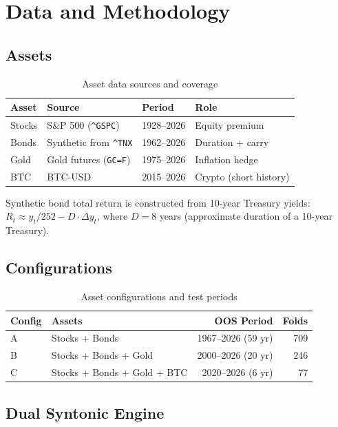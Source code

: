 \documentclass[11pt,a4paper]{article}
\begin{document}
\section{Data and Methodology}

\subsection{Assets}

\begin{table}[H]
\centering
\caption{Asset data sources and coverage}
\label{tab:assets}
\begin{tabular}{llll}
\toprule
Asset & Source & Period & Role \\
\midrule
Stocks & S\&P 500 (\texttt{\^{}GSPC}) & 1928--2026 & Equity premium \\
Bonds & Synthetic from \texttt{\^{}TNX} & 1962--2026 & Duration + carry \\
Gold & Gold futures (\texttt{GC=F}) & 1975--2026 & Inflation hedge \\
BTC & BTC-USD & 2015--2026 & Crypto (short history) \\
\bottomrule
\end{tabular}
\end{table}

Synthetic bond total return is constructed from 10-year Treasury yields: $R_t \approx y_t/252 - D \cdot \Delta y_t$, where $D = 8$ years (approximate duration of a 10-year Treasury).

\subsection{Configurations}

\begin{table}[H]
\centering
\caption{Asset configurations and test periods}
\label{tab:configs}
\begin{tabular}{llrr}
\toprule
Config & Assets & OOS Period & Folds \\
\midrule
A & Stocks + Bonds & 1967--2026 (59 yr) & 709 \\
B & Stocks + Bonds + Gold & 2000--2026 (20 yr) & 246 \\
C & Stocks + Bonds + Gold + BTC & 2020--2026 (6 yr) & 77 \\
\bottomrule
\end{tabular}
\end{table}

\subsection{Dual Syntonic Engine}
\end{document}
